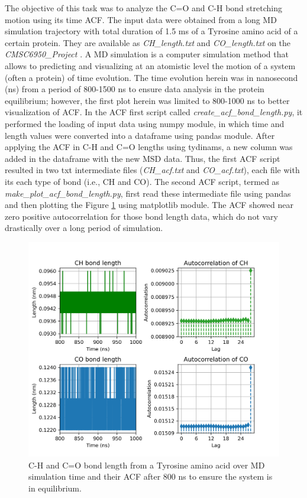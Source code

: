 \documentclass{article}
\begin{document}
The objective of this task was to analyze the C=O and C-H bond stretching motion using its time ACF. The input data were obtained from a long MD simulation trajectory with total duration of 1.5 ms of a Tyrosine amino acid of a certain protein. They are available as {\it CH\_length.txt} and {\it CO\_length.txt} on the {\it CMSC6950\_Project }. A MD simulation is a computer simulation method that allows to predicting and visualizing at an atomistic level the motion of a system (often a protein) of time evolution. The time evolution herein was in nanosecond (ns) from a period of 800-1500 ns to ensure data analysis in the protein equilibrium; however, the first plot herein was limited to 800-1000 ns to better visualization of ACF. In the ACF first script called {\it create\_acf\_bond\_length.py}, it performed the loading of input data using numpy module, in which time and length values were converted into a dataframe using pandas module. After applying the ACF in C-H and C=O lengths using tydinams, a new column was added in the dataframe with the new MSD data. Thus, the first ACF script resulted in two txt intermediate files ({\it CH\_acf.txt} and {\it CO\_acf.txt}), each file with its each type of bond (i.e., CH and CO). The second ACF script, termed as {\it make\_plot\_acf\_bond\_length.py}, first read these intermediate file using pandas and then plotting the Figure \ref{fig:acf_plot} using matplotlib module. The ACF showed near zero positive autocorrelation for those bond length data, which do not vary drastically over a long period of simulation.

\begin{figure}[H]
\centering
\includegraphics[width=\linewidth]{CO_CH_length_acf_plot.png}
\caption{C-H and C=O bond length from a Tyrosine amino acid over MD simulation time and their ACF after 800 ns to ensure the system is in equilibrium.} 
\label{fig:acf_plot}
\end{figure}
\end{document}
